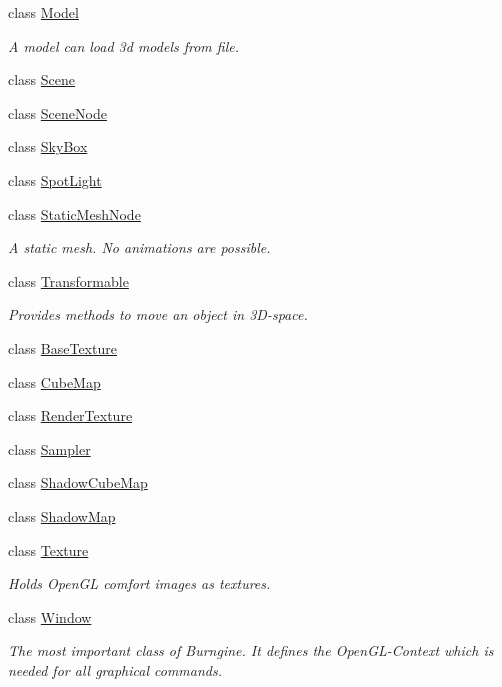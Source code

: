 \begin{DoxyCompactItemize}
class \hyperlink{classburn_1_1_model}{Model}
\begin{DoxyCompactList}\small\item\em A model can load 3d models from file. \end{DoxyCompactList}\item 
class \hyperlink{classburn_1_1_scene}{Scene}
\item 
class \hyperlink{classburn_1_1_scene_node}{Scene\-Node}
\item 
class \hyperlink{classburn_1_1_sky_box}{Sky\-Box}
\item 
class \hyperlink{classburn_1_1_spot_light}{Spot\-Light}
\item 
class \hyperlink{classburn_1_1_static_mesh_node}{Static\-Mesh\-Node}
\begin{DoxyCompactList}\small\item\em A static mesh. No animations are possible. \end{DoxyCompactList}\item 
class \hyperlink{classburn_1_1_transformable}{Transformable}
\begin{DoxyCompactList}\small\item\em Provides methods to move an object in 3\-D-\/space. \end{DoxyCompactList}\item 
class \hyperlink{classburn_1_1_base_texture}{Base\-Texture}
\item 
class \hyperlink{classburn_1_1_cube_map}{Cube\-Map}
\item 
class \hyperlink{classburn_1_1_render_texture}{Render\-Texture}
\item 
class \hyperlink{classburn_1_1_sampler}{Sampler}
\item 
class \hyperlink{classburn_1_1_shadow_cube_map}{Shadow\-Cube\-Map}
\item 
class \hyperlink{classburn_1_1_shadow_map}{Shadow\-Map}
\item 
class \hyperlink{classburn_1_1_texture}{Texture}
\begin{DoxyCompactList}\small\item\em Holds Open\-G\-L comfort images as textures. \end{DoxyCompactList}\item 
class \hyperlink{classburn_1_1_window}{Window}
\begin{DoxyCompactList}\small\item\em The most important class of Burngine. It defines the Open\-G\-L-\/\-Context which is needed for all graphical commands. \end{DoxyCompactList}\item 

\end{DoxyCompactItemize}
